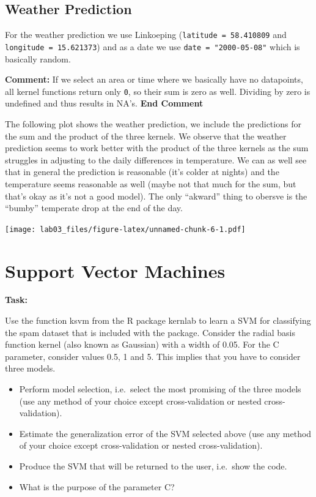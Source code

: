 \documentclass[]{article}
\providecommand{\tightlist}{%
  \setlength{\itemsep}{0pt}\setlength{\parskip}{0pt}}
\begin{document}
\subsection{Weather Prediction}\label{weather-prediction}

For the weather prediction we use Linkoeping
(\texttt{latitude\ =\ 58.410809} and \texttt{longitude\ =\ 15.621373})
and as a date we use \texttt{date\ =\ "2000-05-08"} which is basically
random.

\textbf{Comment:} If we select an area or time where we basically have
no datapoints, all kernel functions return only \texttt{0}, so their sum
is zero as well. Dividing by zero is undefined and thus results in NA's.
\textbf{End Comment}

The following plot shows the weather prediction, we include the
predictions for the sum and the product of the three kernels. We observe
that the weather prediction seems to work better with the product of the
three kernels as the sum struggles in adjusting to the daily differences
in temperature. We can as well see that in general the prediction is
reasonable (it's colder at nights) and the temperature seems reasonable
as well (maybe not that much for the sum, but that's okay as it's not a
good model). The only ``akward'' thing to obersve is the ``bumby''
temperate drop at the end of the day.

\texttt{[image: lab03\_files/figure-latex/unnamed-chunk-6-1.pdf]}

\section{Support Vector Machines}\label{support-vector-machines}

\textbf{Task:}

Use the function ksvm from the R package kernlab to learn a SVM for
classifying the spam dataset that is included with the package. Consider
the radial basis function kernel (also known as Gaussian) with a width
of 0.05. For the C parameter, consider values 0.5, 1 and 5. This implies
that you have to consider three models.

\begin{itemize}
\tightlist
\item
  Perform model selection, i.e.~select the most promising of the three
  models (use any method of your choice except cross-validation or
  nested cross-validation).
\item
  Estimate the generalization error of the SVM selected above (use any
  method of your choice except cross-validation or nested
  cross-validation).
\item
  Produce the SVM that will be returned to the user, i.e.~show the code.
\item
  What is the purpose of the parameter C?
\end{itemize}
\end{document}

